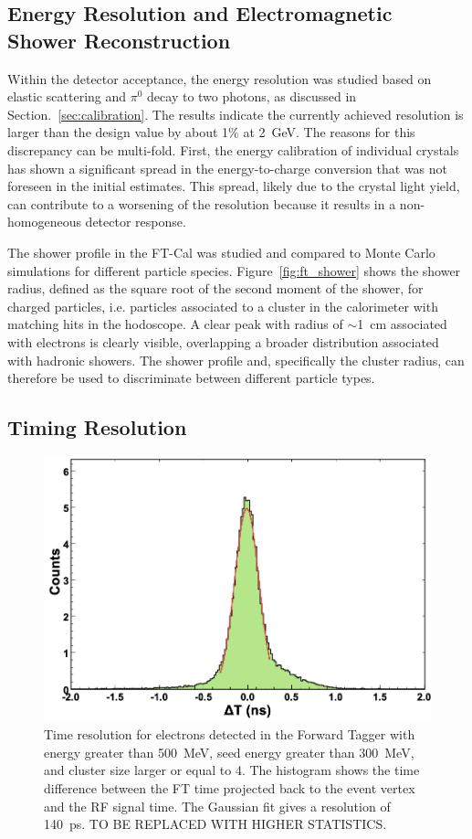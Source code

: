 \subsection{Energy Resolution and Electromagnetic Shower Reconstruction}

Within the detector acceptance, the energy resolution was studied based on elastic scattering and $\pi^0$ decay to
two photons, as discussed in Section.~\ref{sec:calibration}. The results indicate the currently achieved resolution is
larger than the design value by about 1\% at 2~GeV. The reasons for this discrepancy can be multi-fold. First, the
energy calibration of individual crystals has shown a significant spread in the energy-to-charge conversion that was
not foreseen in the initial estimates. This spread, likely due to the crystal light yield, can contribute to a worsening
of the resolution because it results in a non-homogeneous detector response. 

The shower profile in the FT-Cal was studied and compared to Monte Carlo simulations for different particle
species. Figure~\ref{fig:ft_shower} shows the shower radius, defined as the square root of the second moment of
the shower, for charged particles, i.e. particles associated to a cluster in the calorimeter with matching hits in the
hodoscope. A clear peak with radius of $\sim$1~cm associated with electrons is clearly visible, overlapping a
broader distribution associated with hadronic showers. The shower profile and, specifically the cluster radius, can
therefore be used to discriminate between different particle types.

\subsection{Timing Resolution}

\begin{figure}[h]
\includegraphics[height=0.6\columnwidth]{fig/ft_electron_time.png}
\caption{Time resolution for electrons detected in the Forward Tagger with energy greater than 500~MeV, seed
  energy greater than 300~MeV, and cluster size larger or equal to 4. The histogram shows the time difference
  between the FT time projected back to the event vertex and the RF signal time. The Gaussian fit gives a resolution
  of 140~ps. TO BE REPLACED WITH HIGHER STATISTICS.}
\label{fig:electron_time}
\end{figure}

